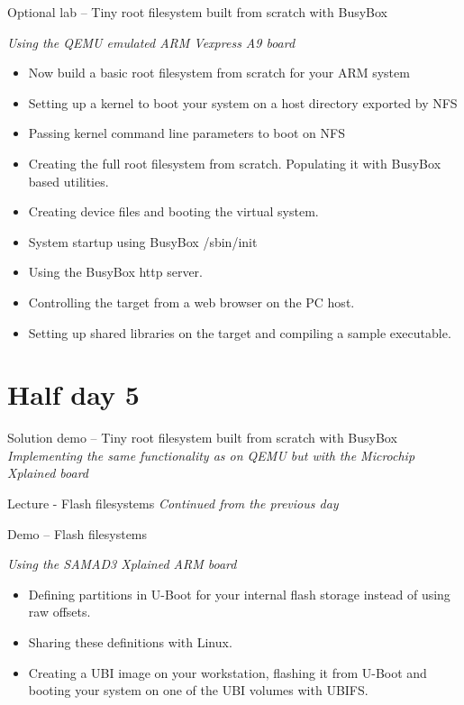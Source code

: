 \documentclass[a4paper,12pt,obeyspaces,spaces,hyphens]{article}
\begin{document}
\feagendaonecolumn
{Optional lab – Tiny root filesystem built from scratch with BusyBox}
{
  {\em Using the QEMU emulated ARM Vexpress A9 board}
  \begin{itemize}
  \item Now build a basic root filesystem from scratch for your ARM system
  \item Setting up a kernel to boot your system on a host
        directory exported by NFS
  \item Passing kernel command line parameters to boot on NFS
  \item Creating the full root filesystem from scratch.
        Populating it with BusyBox based utilities.
  \item Creating device files and booting the virtual system.
  \item System startup using BusyBox /sbin/init
  \item Using the BusyBox http server.
  \item Controlling the target from a web browser on the PC host.
  \item Setting up shared libraries on the target and compiling
        a sample executable.
  \end{itemize}
}

\newpage
\section{Half day 5}

\feagendaonecolumn
{Solution demo – Tiny root filesystem built from scratch with BusyBox}
{
  {\em Implementing the same functionality as on QEMU but with the Microchip Xplained board}
}

\feagendaonecolumn
{Lecture - Flash filesystems}
{
  {\em Continued from the previous day}
}

\feagendaonecolumn
{Demo – Flash filesystems}
{
  {\em Using the SAMAD3 Xplained ARM board}
  \begin{itemize}
  \item Defining partitions in U-Boot for your internal
        flash storage instead of using raw offsets.
  \item Sharing these definitions with Linux.
  \item Creating a UBI image on your workstation, flashing
        it from U-Boot and booting your system on one of
        the UBI volumes with UBIFS.
  \end{itemize}
}
\end{document}
